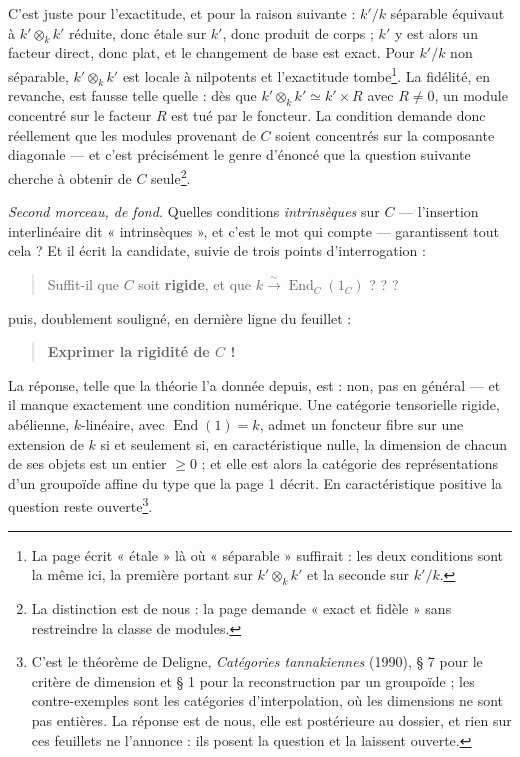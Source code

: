 \documentclass[11pt,a4paper]{article}
\begin{document}
C'est juste pour l'exactitude, et pour la raison suivante : $k'/k$ séparable
équivaut à $k' \otimes_{k} k'$ réduite, donc étale sur $k'$, donc produit de
corps ; $k'$ y est alors un facteur direct, donc plat, et le changement de base
est exact. Pour $k'/k$ non séparable, $k' \otimes_{k} k'$ est locale à
nilpotents et l'exactitude tombe\footnote{La page écrit « étale » là où
« séparable » suffirait : les deux conditions sont la même ici, la première
portant sur $k' \otimes_{k} k'$ et la seconde sur $k'/k$.}. La fidélité, en
revanche, est fausse telle quelle : dès que $k' \otimes_{k} k' \simeq k' \times
R$ avec $R \neq 0$, un module concentré sur le facteur $R$ est tué par le
foncteur. La condition demande donc réellement que les modules
provenant de $C$ soient concentrés sur la composante diagonale — et c'est
précisément le genre d'énoncé que la question suivante cherche à obtenir de $C$
seule\footnote{La distinction est de nous : la page demande « exact et
fidèle » sans restreindre la classe de modules.}.

\emph{Second morceau, de fond.} Quelles conditions \emph{intrinsèques} sur $C$
— l'insertion interlinéaire dit « intrinsèques », et c'est le mot qui compte —
garantissent tout cela ? Et il écrit la candidate, suivie de trois points
d'interrogation :
\begin{quote}
Suffit-il que $C$ soit \textbf{rigide}, et que $k \overset{\sim}{\to}
\operatorname{End}_{C}(1_{C})$ ? ? ?
\end{quote}
puis, doublement souligné, en dernière ligne du feuillet :
\begin{quote}
\textbf{Exprimer la rigidité de $C$ !}
\end{quote}

La réponse, telle que la théorie l'a donnée depuis, est : non, pas en
général — et il manque exactement une condition numérique. Une catégorie
tensorielle rigide, abélienne, $k$-linéaire, avec $\operatorname{End}(1) = k$,
admet un foncteur fibre sur une extension de $k$ si et seulement si, en
caractéristique nulle, la dimension de chacun de ses objets est un entier
$\geq 0$ ; et elle est alors la catégorie des représentations d'un groupoïde
affine du type que la page 1 décrit. En caractéristique positive la question
reste ouverte\footnote{C'est le théorème de Deligne, \emph{Catégories
tannakiennes} (1990), § 7 pour le critère de dimension et § 1 pour la
reconstruction par un groupoïde ; les contre-exemples sont les catégories
d'interpolation, où les dimensions ne sont pas entières. La réponse est de
nous, elle est postérieure au dossier, et rien sur ces feuillets ne l'annonce :
ils posent la question et la laissent ouverte.}.
\end{document}
